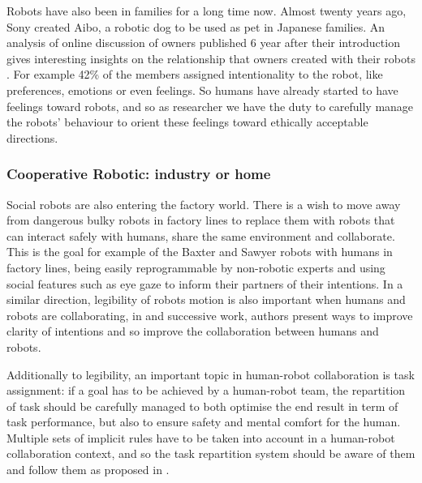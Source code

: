     Robots have also been in families for a long time now. Almost twenty years
    ago, Sony created Aibo, a robotic dog to be used as pet in Japanese
    families. An analysis of online discussion of owners published 6 year after
    their introduction gives interesting insights on the relationship that
    owners created with their robots \citep{friedman2003hardware}. For example
    42\% of the members assigned intentionality to the robot, like preferences,
    emotions or even feelings. So humans have already started to have feelings
    toward robots, and so as researcher we have the duty to carefully manage the
    robots' behaviour to orient these feelings toward ethically acceptable
    directions.

\subsubsection{Cooperative Robotic: industry or home}
	
    Social robots are also entering the factory world. There is a wish to move
    away from dangerous bulky robots in factory lines to replace them with
    robots that can interact safely with humans, share the same environment and
    collaborate. This is the goal for example of the Baxter and Sawyer robots
    with humans in factory lines, being easily reprogrammable by non-robotic
    experts and using social features such as eye gaze to inform their partners
    of their intentions. In a similar direction, legibility of robots motion is
    also important when humans and robots are collaborating, in
    \citet{dragan2013legibility} and successive work, authors present ways to
    improve clarity of intentions and so improve the collaboration between
    humans and robots.

    Additionally to legibility, an important topic in human-robot collaboration
    is task assignment: if a goal has to be achieved by a human-robot team, the
    repartition of task should be carefully managed to both optimise the end
    result in term of task performance, but also to ensure safety and mental
    comfort for the human. Multiple sets of implicit rules have to be taken into
    account in a human-robot collaboration context, and so the task repartition
    system should be aware of them and follow them as proposed in
    \citet{montreuil2007planning}.
	

